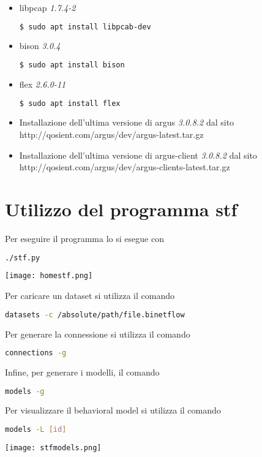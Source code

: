 \documentclass[../main.tex]{subfiles}
\begin{document}
\begin{itemize}
				\item libpcap \textit{1.7.4-2}
\begin{lstlisting}[language=bash]
$ sudo apt install libpcab-dev
\end{lstlisting}

\item bison \textit{3.0.4}
\begin{lstlisting}[language=bash]
$ sudo apt install bison
\end{lstlisting}

\item flex \textit{2.6.0-11}
\begin{lstlisting}[language=bash]
$ sudo apt install flex
\end{lstlisting}

\item Installazione dell'ultima versione di argus \textit{3.0.8.2} dal sito http://qosient.com/argus/dev/argus-latest.tar.gz

\item Installazione dell'ultima versione di argus-client \textit{3.0.8.2} dal sito http://qosient.com/argus/dev/argus-clients-latest.tar.gz

\end{itemize}

\section{Utilizzo del programma stf\\}
Per eseguire il programma lo si esegue con
\begin{lstlisting}[language=bash]
	./stf.py
\end{lstlisting}
\texttt{[image: homestf.png]}

Per caricare un dataset si utilizza il comando
\begin{lstlisting}[language=bash]
	datasets -c /absolute/path/file.binetflow	
\end{lstlisting}

Per generare la connessione si utilizza il comando
\begin{lstlisting}[language=bash]
	connections -g	
\end{lstlisting}

Infine, per generare i modelli, il comando
\begin{lstlisting}[language=bash]
	models -g	
\end{lstlisting}

Per visualizzare il behavioral model si utilizza il comando
\begin{lstlisting}[language=bash]
	models -L [id]	
\end{lstlisting}
\texttt{[image: stfmodels.png]}
\end{document}
